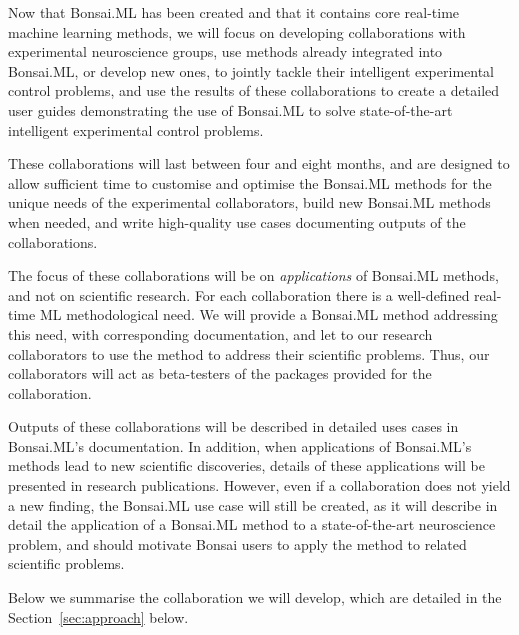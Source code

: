 Now that Bonsai.ML has been created and that it contains core real-time machine
learning methods, we will focus on developing collaborations with experimental
neuroscience groups, use methods already integrated into Bonsai.ML, or develop
new ones, to jointly tackle their intelligent experimental control problems,
and use the results of these collaborations to create a detailed user guides
demonstrating the use of Bonsai.ML to solve state-of-the-art intelligent
experimental control problems.

%
These collaborations will last between four and eight months, and are designed
to allow sufficient time to customise and optimise the Bonsai.ML methods for the
unique needs of the experimental collaborators, build new Bonsai.ML methods when
needed, and write high-quality use cases documenting outputs of the
collaborations.

The focus of these collaborations will be on \emph{applications} of
Bonsai.ML methods, and not on scientific research.
%
For each collaboration there is a well-defined real-time ML methodological
need. We will provide a Bonsai.ML method addressing this need, with
corresponding documentation, and let to our research collaborators to use the
method to address their scientific problems. Thus, our collaborators will act
as beta-testers of the packages provided for the collaboration.

Outputs of these collaborations will be described in detailed uses cases in
Bonsai.ML's documentation.
%
In addition, when applications of Bonsai.ML's methods lead to new scientific
discoveries, details of these applications will be presented in research
publications.
%
However, even if a collaboration does not yield a new finding, the Bonsai.ML
use case will still be created, as it will describe in detail the application
of a Bonsai.ML method to a state-of-the-art neuroscience problem, and should
motivate Bonsai users to apply the method to related scientific problems.

Below we summarise the collaboration we will develop, which are detailed in the
Section~\ref{sec:approach} below.


